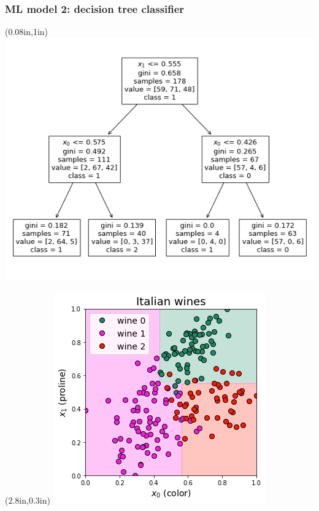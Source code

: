 \begin{frame}
    \frametitle{ML model 2: decision tree classifier}

    \begin{textblock*}{0in}(0.08in,1in) %
        \includegraphics[scale=0.4]{wines-dt-tree.jpg}
    \end{textblock*}
    \begin{textblock*}{0in}(2.8in,0.3in) %
        \includegraphics[scale=0.45]{wines-dt.jpg}
        \end{textblock*}
\end{frame}

